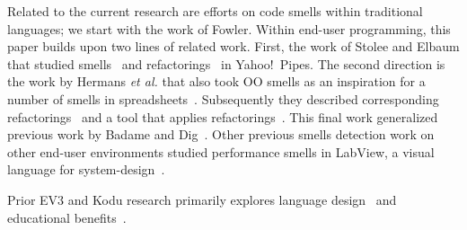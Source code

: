 \documentclass[conference]{IEEEtran}
\begin{document}
\label{sec:related_work}
Related to the current research are efforts on code smells within traditional languages; we start with the work of Fowler\cite{Fowl1999}. 
Within end-user programming, this paper builds upon two lines of related work. First, the work of Stolee and Elbaum that studied smells~\cite{StoleeTSE2013} and refactorings~\cite{Stolee2011} in Yahoo!\ Pipes. The second direction is the work by Hermans \emph{et al.} that also took OO smells as an inspiration for a number of smells in spreadsheets~\cite{Hermans2012intra, Hermans2012inter}. Subsequently they described corresponding refactorings~\cite{Hermans2012intraExt} and a tool that applies refactorings~\cite{hermans2014bumblebee}. This final work generalized previous work by Badame and Dig~\cite{badame2012refactoring}. Other previous smells detection work on other end-user environments  studied performance smells in LabView, a visual language for system-design~\cite{chambers2013smell, chambers2015impact}. 

Prior EV3 and Kodu research primarily explores 
language design~\cite{Fristoe:2011:SSE:2159365.2159396, Stolee:2011:ECS:1953163.1953197, MacLaurin:2009:KEP:1536513.1536516, MacLaurin:2011:DKT:1925844.1926413} 
and educational benefits~\cite{Fowler:2011:KGL:2159365.2159398, Touretzky:2013:AKC:2445196.2445374, Barnes:2002:TIJ:563340.563397, Hood:2005:TPL:1067445.1067454}. 
\end{document}
